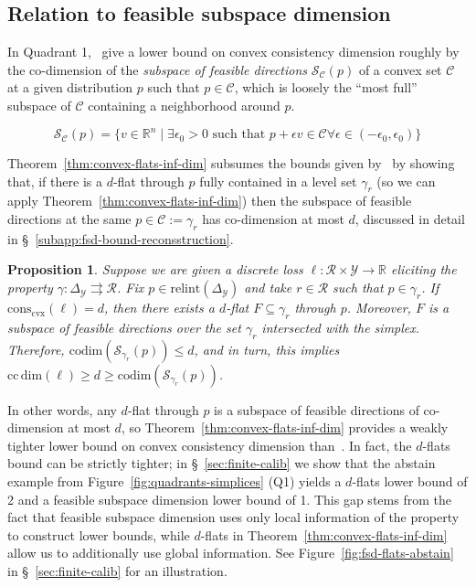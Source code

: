 \documentclass{article} %
\newcommand{\reals}{\mathbb{R}}
\newcommand{\simplex}{\Delta_\Y}
\newcommand{\relint}[1]{\mathrm{relint}(#1)}
\newcommand{\conscvx}{\mathrm{cons}_\mathrm{cvx}}
\newcommand{\ccdim}{\mathrm{cc\,dim}}
\newcommand{\codim}{\mathrm{codim}}
\newcommand{\C}{\mathcal{C}}
\newcommand{\R}{\mathcal{R}}
\newcommand{\Sc}{\mathcal{S}}  %
\newcommand{\Y}{\mathcal{Y}}
\newcommand{\toto}{\rightrightarrows}
\newtheorem{proposition}{Proposition}
\begin{document}
\subsection{Relation to feasible subspace dimension}\label{sec:discrete-predictions-refactored}

In Quadrant 1,~\citet{ramaswamy2016convex} give a lower bound on convex consistency dimension roughly by the co-dimension of the \emph{subspace of feasible directions} $\Sc_{\C}(p)$ of a convex set $\C$ at a given distribution $p$ such that $p \in \C$, which is loosely the ``most full'' subspace of $\C$ containing a neighborhood around $p$.

\begin{equation*}\label{eq:feasible-subspace}
\Sc_\C(p) = \{v \in \reals^n \mid \exists \epsilon_0 > 0 \textrm{ such that } p + \epsilon v \in \C\forall \epsilon \in (-\epsilon_0, \epsilon_0) \}
\end{equation*}

Theorem~\ref{thm:convex-flats-inf-dim} subsumes the  bounds given by~\citet{ramaswamy2016convex} by showing that, if there is a $d$-flat through $p$ fully contained in a level set $\gamma_r$ (so we can apply Theorem~\ref{thm:convex-flats-inf-dim}) then the subspace of feasible directions at the same $p \in \C := \gamma_r$ has co-dimension at most $d$, discussed in detail in \S~\ref{subapp:fsd-bound-reconsstruction}.

\begin{proposition}\label{prop:discrete-bound-subsumes-ramaswamy}
	Suppose we are given a discrete loss $\ell : \R \times \Y \to \reals$ eliciting the property $\gamma: \simplex \toto \R$.
	Fix $p \in \relint \simplex$ and take $r \in \R$ such that $p \in \gamma_r$.  
	If $\conscvx(\ell) = d$, then there exists a $d$-flat $F \subseteq \gamma_r$ through $p$.
	Moreover, $F$ is a subspace of feasible directions over the set $\gamma_r$ intersected with the simplex.
	Therefore, $\codim(\Sc_{\gamma_r}(p)) \leq d$, and in turn, this implies $\ccdim(\ell) \geq d \geq \codim(\Sc_{\gamma_r}(p))$.
\end{proposition}

In other words, any $d$-flat through $p$ is a subspace of feasible directions of co-dimension at most $d$, so Theorem~\ref{thm:convex-flats-inf-dim} provides a weakly tighter lower bound on convex consistency dimension than~\citet[Theorem 16]{ramaswamy2016convex}.
In fact, the $d$-flats bound can be strictly tighter; in \S~\ref{sec:finite-calib} we show that the abstain example from Figure~\ref{fig:quadrants-simplices} (Q1) yields a $d$-flats lower bound of 2 and a feasible subspace dimension lower bound of 1.
This gap stems from the fact that feasible subspace dimension uses only local information of the property to construct lower bounds, while $d$-flats in Theorem~\ref{thm:convex-flats-inf-dim} allow us to additionally use global information.
See Figure~\ref{fig:fsd-flats-abstain} in \S~\ref{sec:finite-calib} for an illustration.
\end{document}
